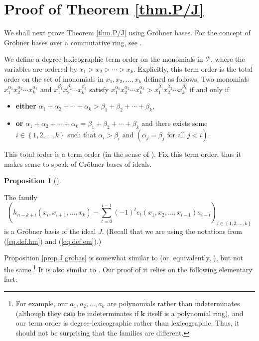 \documentclass[numbers=enddot,12pt,final,onecolumn,notitlepage]{scrartcl}%
\theoremstyle{definition}
\newtheorem{prop}[theo]{Proposition}
\newenvironment{proposition}[1][]
{\begin{prop}[#1]\begin{leftbar}}
{\end{leftbar}\end{prop}}
\let\sumnonlimits\sum
\renewcommand{\sum}{\sumnonlimits\limits}
\begin{document}
\section{Proof of Theorem \ref{thm.P/J}}

We shall next prove Theorem \ref{thm.P/J} using Gr\"{o}bner bases. For the
concept of Gr\"{o}bner bases over a commutative ring, see \cite[detailed
version, \S 3]{Grinbe17}.

We define a degree-lexicographic term order on the monomials in $\mathcal{P}$,
where the variables are ordered by $x_{1}>x_{2}>\cdots>x_{k}$. Explicitly,
this term order is the total order on the set of monomials in $x_{1}%
,x_{2},\ldots,x_{k}$ defined as follows: Two monomials $x_{1}^{\alpha_{1}%
}x_{2}^{\alpha_{2}}\cdots x_{k}^{\alpha_{k}}$ and $x_{1}^{\beta_{1}}%
x_{2}^{\beta_{2}}\cdots x_{k}^{\beta_{k}}$ satisfy $x_{1}^{\alpha_{1}}%
x_{2}^{\alpha_{2}}\cdots x_{k}^{\alpha_{k}}>x_{1}^{\beta_{1}}x_{2}^{\beta_{2}%
}\cdots x_{k}^{\beta_{k}}$ if and only if

\begin{itemize}
\item \textbf{either} $\alpha_{1}+\alpha_{2}+\cdots+\alpha_{k}>\beta_{1}%
+\beta_{2}+\cdots+\beta_{k}$,

\item \textbf{or} $\alpha_{1}+\alpha_{2}+\cdots+\alpha_{k}=\beta_{1}+\beta
_{2}+\cdots+\beta_{k}$ and there exists some $i\in\left\{  1,2,\ldots
,k\right\}  $ such that $\alpha_{i}>\beta_{i}$ and $\left(  \alpha_{j}%
=\beta_{j}\text{ for all }j<i\right)  $.
\end{itemize}

This total order is a term order (in the sense of \cite[detailed version,
Definition 3.5]{Grinbe17}). Fix this term order; thus it makes sense to speak
of Gr\"{o}bner bases of ideals.

\begin{proposition}
\label{prop.J.grobas}The family
\[
\left(  h_{n-k+i}\left(  x_{i},x_{i+1},\ldots,x_{k}\right)  -\sum_{t=0}%
^{i-1}\left(  -1\right)  ^{t}e_{t}\left(  x_{1},x_{2},\ldots,x_{i-1}\right)
a_{i-t}\right)  _{i\in\left\{  1,2,\ldots,k\right\}  }%
\]
is a Gr\"{o}bner basis of the ideal $J$. (Recall that we are using the
notations from (\ref{eq.def.hm}) and (\ref{eq.def.em}).)
\end{proposition}

Proposition \ref{prop.J.grobas} is somewhat similar to \cite[Theorem
1.2.7]{Sturmf08} (or, equivalently, \cite[\S 7.1, Proposition 5]{CoLiOs15}),
but not the same.\footnote{For example, our $a_{1},a_{2},\ldots,a_{k}$ are
polynomials rather than indeterminates (although they \textbf{can} be
indeterminates if $\mathbf{k}$ itself is a polynomial ring), and our term
order is degree-lexicographic rather than lexicographic. Thus, it should not
be surprising that the families are different.} It is also similar to
\cite[comment at the end of \S III.4]{LomQui21}. Our proof of it relies on the
following elementary fact:
\end{document}
